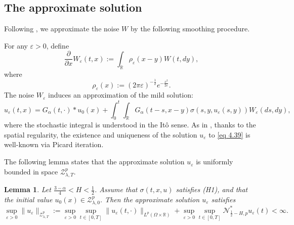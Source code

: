 \documentclass[11pt,reqno]{amsart}
\numberwithin{equation}{section}
\newtheorem{lemma}{Lemma}[section]
\newcommand{\1}{{\bf 1}}
\newcommand{\2}{{\bf 2}}
\begin{document}
 \subsection{The approximate solution}

Following  \cite[Section 4.3]{HW2022}, we approximate the noise $W$  by the following smoothing  procedure. 

For any $\varepsilon>0$,    define 
\begin{equation}\label{eq 4.38}
\frac{\partial}{\partial x}W_{\varepsilon}(t,x):=\int_{\mathbb{R}}\rho_{\varepsilon}(x-y)W(t,dy),
\end{equation}
where 
$$\rho_{\varepsilon}(x):=(2\pi\varepsilon)^{-\frac12}e^{-\frac{x^2}{2\varepsilon}}.$$ 
The noise $W_{\varepsilon}$ induces an approximation of the mild solution:
\begin{equation}\label{eq 4.39}
u_{\varepsilon}(t,x)=G_{\alpha}(t,\cdot)* u_0(x)+\int_0^t\int_{\mathbb{R}}G_{\alpha}(t-s,x-y)\sigma(s,y,u_{\varepsilon}(s,y))W_{\varepsilon}(ds,dy),
\end{equation}
where the stochastic  integral is understood in the It\^{o} sense. As in \cite{HHLNT2017,HW2022}, thanks to the spatial regularity, the existence and uniqueness of the solution $u_{\varepsilon} $ to    \eqref{eq 4.39} is well-known via  Picard iteration.

 The following lemma states that the approximate solution $u_{\varepsilon}$ is uniformly bounded in space $\mathcal{Z}_{\lambda,T}^p$.  
 \begin{lemma}\label{lem 4.5} 
 Let $\frac{3-\alpha}{4}<H<\frac12$. Assume that  $\sigma(t,x,u)$ satisfies  (H1), and that  the initial value $u_0(x)\in\mathcal{Z}_{\lambda,0}^p$. Then  the approximate solution $u_{\varepsilon}$ satisfies
 \begin{equation}\label{eq 4.40}
 \sup_{\varepsilon>0}\|u_{\varepsilon}\|_{\mathcal{Z}_{\lambda,T}^p} :=\sup_{\varepsilon>0}\sup_{t\in[0,T]}\|u_{\varepsilon}(t,\cdot)\|_{L^p(\Omega\times \mathbb{R})}+\sup_{\varepsilon>0}\sup_{t\in[0,T]}\mathcal{N}^*_{\frac12-H,p}u_{\varepsilon}(t)<\infty.
 \end{equation}
  \end{lemma}
  
\end{document}
